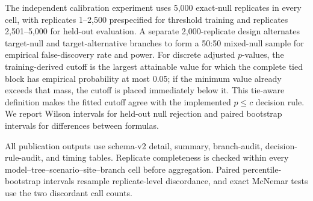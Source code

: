 The independent calibration experiment uses 5,000 exact-null replicates in every cell, with replicates 1--2,500 prespecified for threshold training and replicates 2,501--5,000 for held-out evaluation. A separate 2,000-replicate design alternates target-null and target-alternative branches to form a 50:50 mixed-null sample for empirical false-discovery rate and power. For discrete adjusted \(p\)-values, the training-derived cutoff is the largest attainable value for which the complete tied block has empirical probability at most 0.05; if the minimum value already exceeds that mass, the cutoff is placed immediately below it. This tie-aware definition makes the fitted cutoff agree with the implemented \(p\leq c\) decision rule. We report Wilson intervals for held-out null rejection and paired bootstrap intervals for differences between formulas.

All publication outputs use schema-v2 detail, summary, branch-audit, decision-rule-audit, and timing tables. Replicate completeness is checked within every model--tree--scenario--site--branch cell before aggregation. Paired percentile-bootstrap intervals resample replicate-level discordance, and exact McNemar tests use the two discordant call counts.
